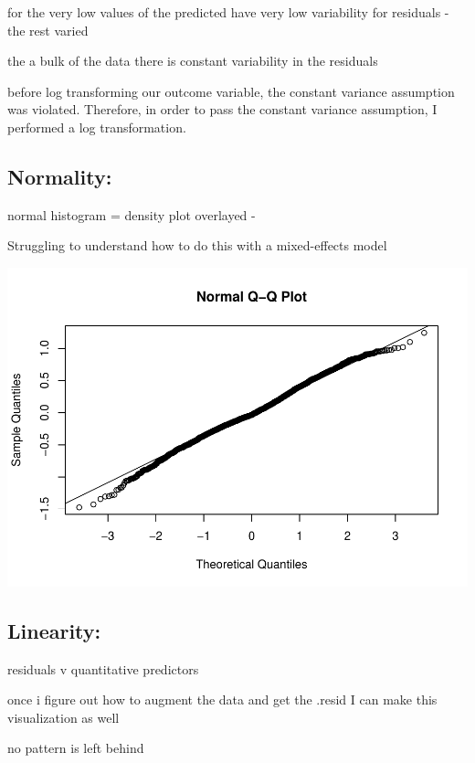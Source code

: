 \documentclass[
  letterpaper,
  DIV=11,
  numbers=noendperiod]{scrreprt}
\begin{document}
for the very low values of the predicted have very low variability for
residuals - the rest varied

the a bulk of the data there is constant variability in the residuals

before log transforming our outcome variable, the constant variance
assumption was violated. Therefore, in order to pass the constant
variance assumption, I performed a log transformation.

\hypertarget{normality}{%
\subsection{Normality:}\label{normality}}

normal histogram = density plot overlayed -

Struggling to understand how to do this with a mixed-effects model

\includegraphics{Chapter2/Chapter2_files/figure-pdf/normal-1.pdf}

\hypertarget{linearity}{%
\subsection{Linearity:}\label{linearity}}

residuals v quantitative predictors

once i figure out how to augment the data and get the .resid I can make
this visualization as well

no pattern is left behind
\end{document}
